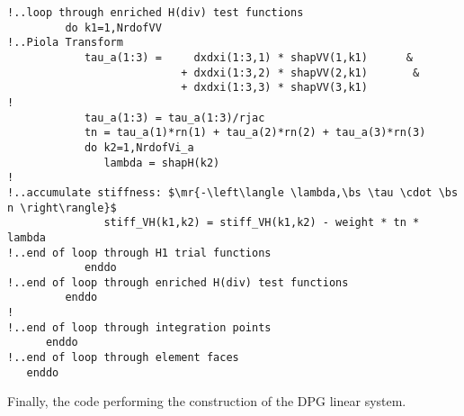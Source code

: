 \begin{lstlisting}[mathescape,caption=\file{POISSON/ULTRAWEAK\_DPG/}\routine{elem}: boundary integration]
!..loop through enriched H(div) test functions
         do k1=1,NrdofVV
!..Piola Transform
            tau_a(1:3) =     dxdxi(1:3,1) * shapVV(1,k1)      &
                           + dxdxi(1:3,2) * shapVV(2,k1)       &
                           + dxdxi(1:3,3) * shapVV(3,k1)
!
            tau_a(1:3) = tau_a(1:3)/rjac
            tn = tau_a(1)*rn(1) + tau_a(2)*rn(2) + tau_a(3)*rn(3)
            do k2=1,NrdofVi_a
               lambda = shapH(k2)
!
!..accumulate stiffness: $\mr{-\left\langle \lambda,\bs \tau \cdot \bs n \right\rangle}$
               stiff_VH(k1,k2) = stiff_VH(k1,k2) - weight * tn * lambda
!..end of loop through H1 trial functions
            enddo
!..end of loop through enriched H(div) test functions
         enddo   
!
!..end of loop through integration points
      enddo
!..end of loop through element faces
   enddo

\end{lstlisting}
Finally, the code performing the construction of the DPG linear system.
